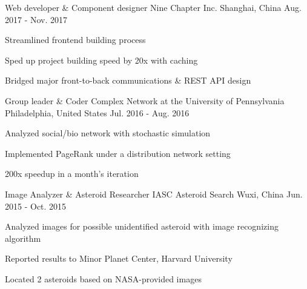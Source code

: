 \begin{cventries}
  \cventry
    {Web developer \& Component designer}
    {Nine Chapter Inc.}
    {Shanghai, China}
    {Aug. 2017 - Nov. 2017}
    {
      \begin{cvitems}
        \item {Streamlined frontend building process}
        \item {Sped up project building speed by 20x with caching}
        \item {Bridged major front-to-back communications \& REST API design}
      \end{cvitems}
    }

  \cventry
    {Group leader \& Coder}
    {Complex Network at the University of Pennsylvania}
    {Philadelphia, United States}
    {Jul. 2016 - Aug. 2016}
    {
      \begin{cvitems}
        \item {Analyzed social/bio network with stochastic simulation}
        \item {Implemented PageRank under a distribution network setting}
        \item {200x speedup in a month's iteration}
      \end{cvitems}
    }

  \cventry
    {Image Analyzer \& Asteroid Researcher}
    {IASC Asteroid Search}
    {Wuxi, China}
    {Jun. 2015 - Oct. 2015}
    {
      \begin{cvitems}
        \item {Analyzed images for possible unidentified asteroid with image recognizing algorithm}
        \item {Reported results to Minor Planet Center, Harvard University}
        \item {Located 2 asteroids based on NASA-provided images}
      \end{cvitems}
    }
\end{cventries}
